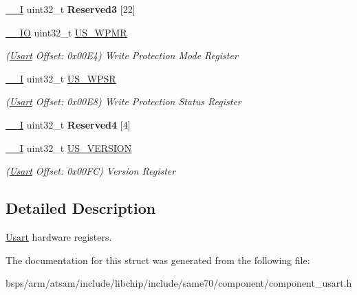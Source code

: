 \begin{DoxyCompactItemize}
\mbox{\label{structUsart_a997cc31cabe5872606fd76a15f1694c3}} 
\mbox{\hyperlink{core__cm7_8h_af63697ed9952cc71e1225efe205f6cd3}{\+\_\+\+\_\+I}} uint32\+\_\+t {\bfseries Reserved3} \mbox{[}22\mbox{]}
\item 
\mbox{\label{structUsart_a4f68929355c4a31ff533468a720438b7}} 
\mbox{\hyperlink{core__cm7_8h_aec43007d9998a0a0e01faede4133d6be}{\+\_\+\+\_\+\+IO}} uint32\+\_\+t \mbox{\hyperlink{structUsart_a4f68929355c4a31ff533468a720438b7}{U\+S\+\_\+\+W\+P\+MR}}
\begin{DoxyCompactList}\small\item\em (\mbox{\hyperlink{structUsart}{Usart}} Offset\+: 0x00\+E4) Write Protection Mode Register \end{DoxyCompactList}\item 
\mbox{\label{structUsart_a0acc127462a24739e4d8f21fd0bc32ad}} 
\mbox{\hyperlink{core__cm7_8h_af63697ed9952cc71e1225efe205f6cd3}{\+\_\+\+\_\+I}} uint32\+\_\+t \mbox{\hyperlink{structUsart_a0acc127462a24739e4d8f21fd0bc32ad}{U\+S\+\_\+\+W\+P\+SR}}
\begin{DoxyCompactList}\small\item\em (\mbox{\hyperlink{structUsart}{Usart}} Offset\+: 0x00\+E8) Write Protection Status Register \end{DoxyCompactList}\item 
\mbox{\label{structUsart_a9a97863a96d7dfee3e85aa6184a1cbb0}} 
\mbox{\hyperlink{core__cm7_8h_af63697ed9952cc71e1225efe205f6cd3}{\+\_\+\+\_\+I}} uint32\+\_\+t {\bfseries Reserved4} \mbox{[}4\mbox{]}
\item 
\mbox{\label{structUsart_acf96cca990089b272ef1402c545af500}} 
\mbox{\hyperlink{core__cm7_8h_af63697ed9952cc71e1225efe205f6cd3}{\+\_\+\+\_\+I}} uint32\+\_\+t \mbox{\hyperlink{structUsart_acf96cca990089b272ef1402c545af500}{U\+S\+\_\+\+V\+E\+R\+S\+I\+ON}}
\begin{DoxyCompactList}\small\item\em (\mbox{\hyperlink{structUsart}{Usart}} Offset\+: 0x00\+FC) Version Register \end{DoxyCompactList}\end{DoxyCompactItemize}


\subsection{Detailed Description}
\mbox{\hyperlink{structUsart}{Usart}} hardware registers. 

The documentation for this struct was generated from the following file\+:\begin{DoxyCompactItemize}
\item 
bsps/arm/atsam/include/libchip/include/same70/component/component\+\_\+usart.\+h\end{DoxyCompactItemize}
